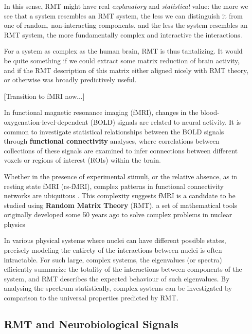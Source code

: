 \documentclass[12pt]{spieman}  %
\begin{document}
\begin{spacing}{2}
In this sense, RMT might have real \textit{explanatory} and
\textit{statistical} value: the more we see that a system resembles an RMT
system, the less we can distinguish it from one of random, non-interacting
components, and the less the system resembles an RMT system, the more
fundamentally complex and interactive the interactions.

For a system as complex as the human brain, RMT is thus tantalizing. It would
be quite something if we could extract some matrix reduction of brain activity,
and if the RMT description of this matrix either aligned nicely with RMT
theory, or otherwise was broadly predictively useful.

[Transition to fMRI now...]


In functional magnetic resonance imaging (fMRI), changes in the
blood-oxygenation-level-dependent (BOLD) signals are related to neural
activity. It is common to investigate statistical relationships between the
BOLD signals through \textbf{functional connectivity} analyses, where
correlations between collections of these signals are examined to infer
connections between different voxels or regions of interest (ROIs) within the
brain.

Whether in the presence of experimental stimuli, or the relative absence, as in
resting state fMRI (rs-fMRI), complex patterns in functional connectivity
networks are ubiquitous
\cite{bucknerBrainDefaultNetwork2008,foxCoverHumanBrain2005,gonzalez-castilloTaskbasedDynamicFunctional2018,hermundstadStructuralFoundationsRestingstate2013}.
This complexity suggests fMRI is a candidate to be studied using \textbf{Random
Matrix Theory} (RMT), a set of mathematical tools originally developed some 50
years ago to solve complex problems in nuclear physics
\cite{guhrRandommatrixTheoriesQuantum1998a,mehtaRandomMatrices2004}

In various physical systems where nuclei can have different possible states,
precisely modeling the entirety of the interactions between nuclei is often
intractable. For such large, complex systems, the eigenvalues (or spectra)
efficiently summarize the totality of the interactions between components of
the system, and RMT describes the expected behaviour of such eigenvalues. By
analysing the spectrum statistically, complex systems can be investigated by
comparison to the universal properties predicted by RMT.

\subsection{RMT and Neurobiological Signals}


\end{spacing}
\end{document}
